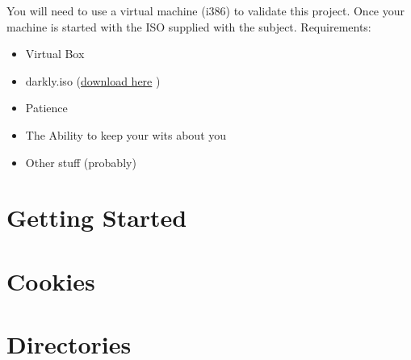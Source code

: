 You will need to use a virtual machine 
(i386) to validate this project. Once your
machine is started with the ISO supplied with the subject.
Requirements:
\begin{itemize}
    \item Virtual Box
    \item darkly.iso (\href{https://drive.google.com/file/d/145dbZHjZWyMiRscj-72jE3n5PM5vXyB9/view?usp=sharing}{download here} )
    \item Patience
    \item The Ability to keep your wits about you
    \item Other stuff (probably)
\end{itemize}

\section{Getting Started}






\section{Cookies}


\clearpage

\section{Directories}


\clearpage

